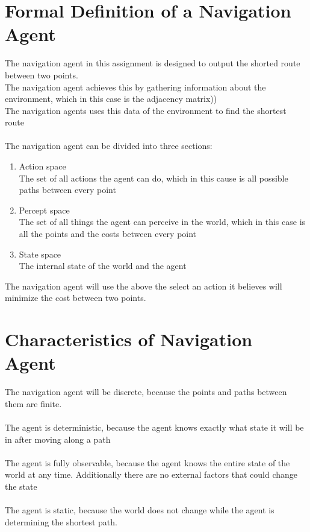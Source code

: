 \documentclass[12pt]{article}
\begin{document}
    \maketitle

    \section{Formal Definition of a Navigation Agent}
    The navigation agent in this assignment is designed to output the shorted route between two points.\\
    The navigation agent achieves this by gathering information about the environment, which in this case is the adjacency matrix))\\
    The navigation agents uses this data of the environment to find the shortest route\\
    \\
    The navigation agent can be divided into three sections:\\
    \begin{enumerate}
        \item Action space\\
            The set of all actions the agent can do, which in this cause is all possible paths between every point

        \item Percept space\\
            The set of all things the agent can perceive in the world, which in this case is all the points and the costs between every point

        \item State space\\
            The internal state of the world and the agent
    \end{enumerate}

    The navigation agent will use the above the select an action it believes will minimize the cost between two points.

    \section{Characteristics of Navigation Agent}

    The navigation agent will be discrete, because the points and paths between them are  finite.\\
    \\
    The agent is deterministic, because the agent knows exactly what state it will be in after moving along a path\\
    \\
    The agent is fully observable, because the agent knows the entire state of the world at any time. Additionally there are no external factors that could change the state\\
    \\
    The agent is static, because the world does not change while the agent is determining the  shortest path.
\end{document}
